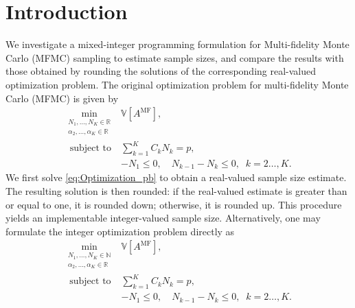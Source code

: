 \section{Introduction}\label{sec:Intro}
We investigate a mixed-integer programming formulation for Multi-fidelity Monte Carlo (MFMC) sampling to estimate sample sizes, and compare the results with those obtained by rounding the solutions of the corresponding real-valued optimization problem. The original optimization problem for multi-fidelity Monte Carlo (MFMC) is given by
%
\begin{equation}\label{eq:Optimization_pb}
    \begin{array}{ll}
    \min \limits_{\begin{array}{c}\scriptstyle N_1,\ldots, N_K\in \mathbb{R} \\[-4pt]
\scriptstyle \alpha_2,\ldots,\alpha_K\in \mathbb{R}
\end{array}} &\mathbb{V}\left[A^{\text{MF}}\right],\\
       \;\,\text{subject to} &\displaystyle\sum\limits_{k=1}^K C_kN_k=p,\\[2pt]
       &\displaystyle -N_1\le 0,\quad \displaystyle N_{k-1}-N_k\le 0, \;\; k=2\ldots,K.
    \end{array}
\end{equation}
%
We first solve \eqref{eq:Optimization_pb} to obtain a real-valued sample size estimate. The resulting solution is then rounded: if the real-valued estimate is greater than or equal to one, it is rounded down; otherwise, it is rounded up. This procedure yields an implementable integer-valued sample size. Alternatively, one may formulate the integer optimization problem directly as
%
\begin{equation}\label{eq:Optimization_pb_integer}
    \begin{array}{ll}
    \min \limits_{\begin{array}{c}\scriptstyle N_1,\ldots, N_K\in \mathbb{N} \\[-4pt]
\scriptstyle \alpha_2,\ldots,\alpha_K\in \mathbb{R}
\end{array}} &\mathbb{V}\left[A^{\text{MF}}\right],\\
       \;\,\text{subject to} &\displaystyle\sum\limits_{k=1}^K C_kN_k=p,\\[2pt]
       &\displaystyle -N_1\le 0,\quad \displaystyle N_{k-1}-N_k\le 0, \;\; k=2\ldots,K.
    \end{array}
\end{equation}
%